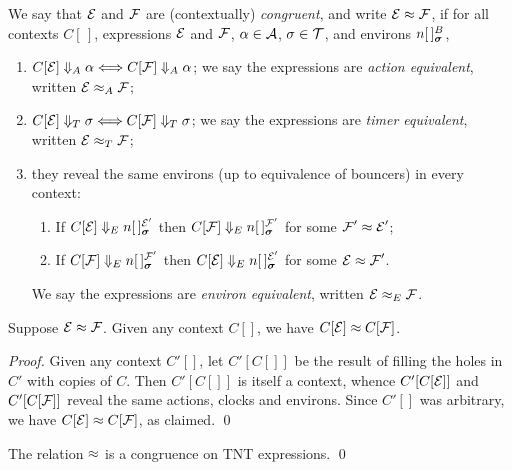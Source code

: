 \documentclass[orivec,envcountsame]{llncs}
\begin{document}
\begin{definition}

We say that $\text{$\mathcal{E}$}$ and $\text{$\mathcal{F}$}$ are (contextually) \emph{congruent}, and write
$\text{$\mathcal{E}$} \approx \text{$\mathcal{F}$}$, if for all contexts $C[\,]$, expressions $\text{$\mathcal{E}$}$ and
$\text{$\mathcal{F}$}$, $\alpha \in \text{$\mathcal{A}$}$, $\sigma \in \text{$\mathcal{T}$}$, and environs
$\locv{n}{\,}{B}{\vec{\sigma}}$,

\begin{enumerate}
\item
     $C[\text{$\mathcal{E}$}] \mathrel{\Downarrow_{A}} \alpha \Longleftrightarrow C[\text{$\mathcal{F}$}] \mathrel{\Downarrow_{A}} \alpha$;
     we say the expressions are \emph{action equivalent}, written $\text{$\mathcal{E}$} \mathrel{\approx_{A}}
     \text{$\mathcal{F}$}$; 
\item
     $C[\text{$\mathcal{E}$}] \mathrel{\Downarrow_{T}} \sigma \Longleftrightarrow C[\text{$\mathcal{F}$}] \mathrel{\Downarrow_{T}} \sigma$; we
     say the expressions are \emph{timer equivalent}, written   $\text{$\mathcal{E}$} \mathrel{\approx_{T}}
     \text{$\mathcal{F}$}$; 
\item
     they reveal the same environs (up to equivalence of bouncers) in every 
     context:
     \begin{enumerate}
     \item
        If $C[\expr] \RevealsE \locv{n}{\,}{\expr'}{\vec{\sigma}}$ then
        $C[\exprb] \RevealsE \locv{n}{\,}{\exprb'}{\vec{\sigma}}$
        for some $\text{$\mathcal{F}$}' \approx \text{$\mathcal{E}$}'$;
     \item
        If $C[\exprb] \RevealsE \locv{n}{\,}{\exprb'}{\vec{\sigma}}$ then
        $C[\expr] \RevealsE \locv{n}{\,}{\expr'}{\vec{\sigma}}$
        for some $\text{$\mathcal{E}$} \approx \text{$\mathcal{F}$}'$.
     \end{enumerate}
     We say the expressions are \emph{environ equivalent}, written $\text{$\mathcal{E}$} \mathrel{\approx_{E}} 
     \text{$\mathcal{F}$}$.
\end{enumerate}

\end{definition}


\begin{proposition}
\label{prop:context-substitution} 
Suppose $\text{$\mathcal{E}$} \approx \text{$\mathcal{F}$}$. Given any context $C[]$, we have $C[\text{$\mathcal{E}$}]
\approx C[\text{$\mathcal{F}$}]$.
\end{proposition}
\begin{proof}
Given any context $C'[]$, let $C'[C[]]$ be the result of filling the
holes in $C'$ with copies of $C$. Then $C'[C[]]$ is itself a context,
whence $C'[C[\text{$\mathcal{E}$}]]$ and $C'[C[\text{$\mathcal{F}$}]]$ reveal the same actions,
clocks and environs. Since $C'[]$ was arbitrary, we have $C[\text{$\mathcal{E}$}] \approx
C[\text{$\mathcal{F}$}]$, as claimed.
\qed \end{proof}

\begin{theorem}
The relation $\approx$ is a congruence on TNT expressions. \qed
\end{theorem}
\end{document}
